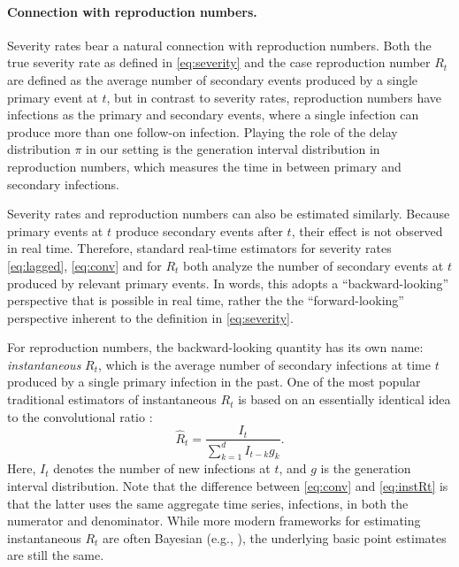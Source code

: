 \documentclass{article}
\renewcommand{\hat}{\widehat} %
\begin{document}
\paragraph{Connection with reproduction numbers.} 

Severity rates bear a natural connection with reproduction numbers. Both the
true severity rate as defined in \eqref{eq:severity} and the case reproduction
number $R_t$ are defined as the average number of secondary events produced by a
single primary event at $t$, but in contrast to severity rates, reproduction
numbers have infections as the primary and secondary events, where a single
infection can produce more than one follow-on infection. Playing the role of the
delay distribution $\pi$ in our setting is the generation interval distribution
in reproduction numbers, which measures the time in between primary and
secondary infections.  

Severity rates and reproduction numbers can also be estimated similarly. Because
primary events at $t$ produce secondary events after $t$, their effect is not
observed in real time. Therefore, standard real-time estimators for severity
rates \eqref{eq:lagged}, \eqref{eq:conv} and for $R_t$ both analyze the number
of  secondary events at $t$ produced by relevant primary events. In words, this 
adopts a ``backward-looking'' perspective that is possible in real time, rather the 
the ``forward-looking'' perspective inherent to the definition in
\eqref{eq:severity}. 

For reproduction numbers, the backward-looking quantity has its own name:
\emph{instantaneous} $R_t$, which is the average number of secondary infections
at time $t$ produced by a single primary infection in the past. One of the most
popular traditional estimators of instantaneous $R_t$ is based on an essentially 
identical idea to the convolutional ratio \citep{fraser2007, wallinga2007how}: 
\begin{equation}
\label{eq:instRt}
\hat{R}_t = \frac{I_t}{\sum_{k=1}^d I_{t-k} g_k}.
\end{equation}
Here, $I_t$ denotes the number of new infections at $t$, and $g$ is the
generation interval distribution. Note that the difference between
\eqref{eq:conv} and \eqref{eq:instRt} is that the latter uses the same aggregate 
time series, infections, in both the numerator and denominator. While more
modern frameworks for estimating instantaneous $R_t$ are often Bayesian (e.g.,
\citealp{cori2013new}), the underlying basic point estimates are still the same.
\end{document}
